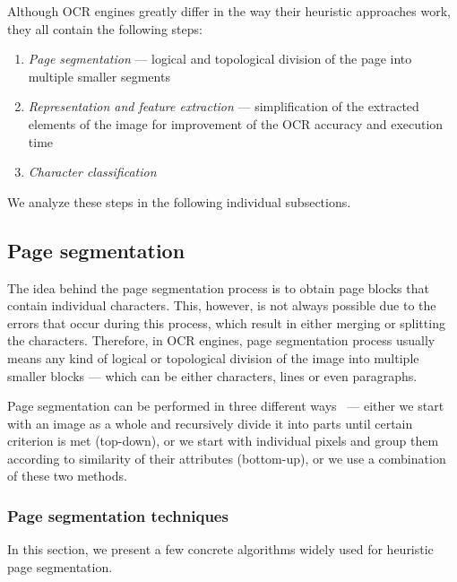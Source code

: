 Although OCR engines greatly differ in the way their heuristic approaches work, they all contain the following steps:
\begin{enumerate}
    \item \emph{Page segmentation} --- logical and topological division of the page into multiple smaller segments
    \item \emph{Representation and feature extraction} --- simplification of the extracted elements of the image for improvement of the OCR accuracy and execution time
    \item \emph{Character classification}
\end{enumerate}

We analyze these steps in the following individual subsections.

\subsection{Page segmentation}

The idea behind the page segmentation process is to obtain page blocks that contain individual characters. This, however, is not always possible due to the errors that occur during this process, which result in either merging or splitting the characters. Therefore, in OCR engines, page segmentation process usually means any kind of logical or topological division of the image into multiple smaller blocks --- which can be either characters, lines or even paragraphs.

Page segmentation can be performed in three different ways~\citep{segmentationBenchmark} --- either we start with an image as a whole and recursively divide it into parts until certain criterion is met (top-down), or we start with individual pixels and group them according to similarity of their attributes (bottom-up), or we use a combination of these two methods.

\subsubsection{Page segmentation techniques}

In this section, we present a few concrete algorithms widely used for heuristic page segmentation.



\clearpage

